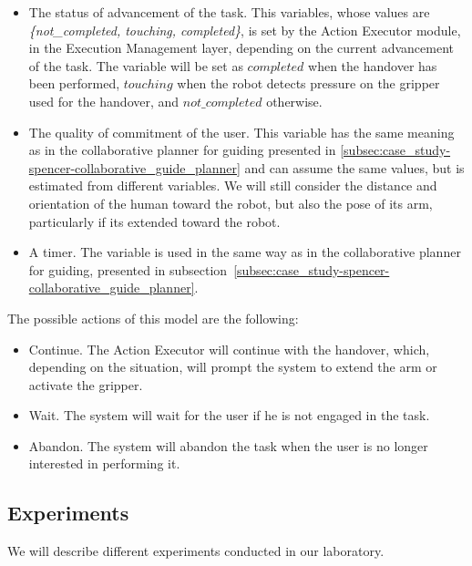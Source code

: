 \begin{itemize}
\item The status of advancement of the task. This variables, whose values are \textit{\{not\_completed, touching, completed\}}, is set by the Action Executor module, in the Execution Management layer, depending on the current advancement of the task. The variable will be set as $completed$ when the handover has been performed, $touching$ when the robot detects pressure on the gripper used for the handover, and $not\_completed$ otherwise. 
\item The quality of commitment of the user. This variable has the same meaning as in the collaborative planner for guiding presented in \ref{subsec:case_study-spencer-collaborative_guide_planner} and can assume the same values, but is estimated from different variables. We will still consider the distance and orientation of the human toward the robot, but also the pose of its arm, particularly if its extended toward the robot. 
\item A timer. The variable is used in the same way as in the collaborative planner for guiding, presented in subsection~\ref{subsec:case_study-spencer-collaborative_guide_planner}.
\end{itemize}

The possible actions of this model are the following:
\begin{itemize}
\item Continue. The Action Executor will continue with the handover, which, depending on the situation, will prompt the system to extend the arm or activate the gripper.
\item Wait. The system will wait for the user if he is not engaged in the task.
\item Abandon. The system will abandon the task when the user is no longer interested in performing it. 
\end{itemize} 

\subsection{Experiments}
\label{subsec:case_study-helper-experiments}
We will describe different experiments conducted in our laboratory.


